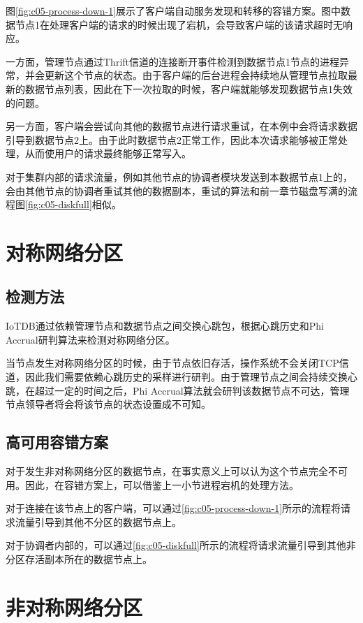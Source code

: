 图\ref{fig:c05-process-down-1}展示了客户端自动服务发现和转移的容错方案。图中数据节点1在处理客户端的请求的时候出现了宕机，会导致客户端的该请求超时无响应。

一方面，管理节点通过Thrift信道的连接断开事件检测到数据节点1节点的进程异常，并会更新这个节点的状态。由于客户端的后台进程会持续地从管理节点拉取最新的数据节点列表，因此在下一次拉取的时候，客户端就能够发现数据节点1失效的问题。

另一方面，客户端会尝试向其他的数据节点进行请求重试，在本例中会将请求数据引导到数据节点2上。由于此时数据节点2正常工作，因此本次请求能够被正常处理，从而使用户的请求最终能够正常写入。


对于集群内部的请求流量，例如其他节点的协调者模块发送到本数据节点1上的\fragmentinstance ，会由其他节点的协调者重试其他的数据副本，重试的算法和前一章节磁盘写满的流程图\ref{fig:c05-diskfull}相似。

\section{对称网络分区}

\subsection{检测方法}

IoTDB通过依赖管理节点和数据节点之间交换心跳包，根据心跳历史和Phi Accrual研判算法来检测对称网络分区。

当节点发生对称网络分区的时候，由于节点依旧存活，操作系统不会关闭TCP信道，因此我们需要依赖心跳历史的采样进行研判。由于管理节点之间会持续交换心跳，在超过一定的时间之后，Phi Accrual算法就会研判该数据节点不可达，管理节点领导者将会将该节点的状态设置成不可知。


\subsection{高可用容错方案}

对于发生非对称网络分区的数据节点，在事实意义上可以认为这个节点完全不可用。因此，在容错方案上，可以借鉴上一小节进程宕机的处理方法。

对于连接在该节点上的客户端，可以通过\ref{fig:c05-process-down-1}所示的流程将请求流量引导到其他不分区的数据节点上。

对于协调者内部的\fragmentinstance ，可以通过\ref{fig:c05-diskfull}所示的流程将请求流量引导到其他非分区存活副本所在的数据节点上。


\section{非对称网络分区}


